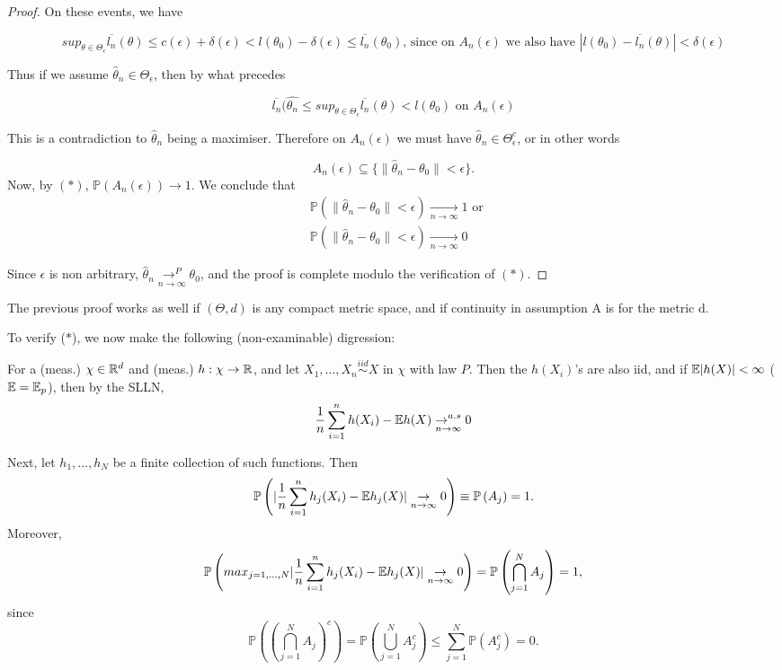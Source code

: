 \documentclass[a4paper]{article}
\begin{document}
\begin{proof}
	On these events, we have 

	\[
		sup_{\theta \in \Theta_{\epsilon}} \overline{l_n} (\theta) \le  c(\epsilon) + \delta(\epsilon) < l(\theta_0) - \delta(\epsilon) \le \overline{l_n}(\theta_{0}) \text{, since on $A_n(\epsilon)$ we also have } |l(\theta_0) - \overline{l_n}(\theta)| < \delta(\epsilon)
	\] 

	Thus if we assume $\hat{\theta}_n \in \Theta_{\epsilon}$, then by what precedes

	\[
		\overline{l_n}(\hat{\theta_n} \le  sup_{\theta \in \Theta_{\epsilon}} \overline{l_n}(\theta) < l(\theta_0) \text{ on } A_n(\epsilon)
	\]

	This is a contradiction to $\hat{\theta}_n$ being a maximiser. Therefore on $A_n(\epsilon)$ we must have  $\hat{\theta}_n \in  \Theta_{\epsilon}^{c}$, or in other words

	\[
		A_n(\epsilon) \subseteq \{\| \hat{\theta}_n - \theta_0\| < \epsilon\} 
	.\] 
	Now, by $(\ast)$,  $\mathbb{P}\left( A_n(\epsilon) \right) \to 1$. We conclude that
	 \begin{align*}
		&\mathbb{P}\left( \| \hat{\theta}_n - \theta_0 \| < \epsilon  \right) \underset{n\to \infty}{\to } 1 \text{ or } \\
		&\mathbb{P}\left( \| \hat{\theta}_n - \theta_0\| < \epsilon \right) \underset{n\to \infty}{\to } 0
	\end{align*}

	Since $\epsilon$ is non arbitrary,  $\hat{\theta}_n \underset{n\to \infty}{\to^{P} } \theta_0$, and the proof is complete modulo the verification of $(\ast)$.
\end{proof}

\begin{remark}
	The previous proof works as well if $(\Theta, d)$ is any compact metric space, and if continuity in assumption A is for the metric d.
\end{remark}

To verify ($\ast$), we now make the following (non-examinable) digression:

For a (meas.) $\chi \in \mathbb{R}^{d}$ and (meas.) $h: \chi \to \mathbb{R}$, and let $X_1, \ldots, X_n \stackrel{iid}{\sim} X$ in $\chi$ with law $P$. Then the $h(X_i)$'s are also iid, and if $\mathbb{E} |h(X)| < \infty$ ($\mathbb{E} = \mathbb{E}_p$), then by the SLLN,
\[
	\frac{1}{n} \sum_{i=1}^{n} h(X_i) - \mathbb{E} h(X) \underset{n \to \infty}{\to^{a.s}} 0 
\] 

Next, let $h_1, \ldots, h_N$ be a finite collection of such functions. Then
\[
	\mathbb{P}\left( |\frac{1}{n} \sum_{i=1}^{n} h_j (X_i) - \mathbb{E} h_j (X)  | \underset{n \to \infty}{\to} 0 \right) \equiv \mathbb{P}\left( A_j \right) = 1.
\] 
Moreover,
\[
	\mathbb{P}\left( max_{j=1,\ldots,N} |\frac{1}{n} \sum_{i=1}^{n} h_j (X_i) - \mathbb{E} h_j (X)  | \underset{n \to \infty}{\to} 0 \right) = \mathbb{P}\left( \bigcap_{j=1}^{N} A_j  \right) = 1,
\] since
\[
	\mathbb{P}\left( (\bigcap_{j=1}^{N}A_j)^{c}  \right) = \mathbb{P}\left( \bigcup_{j=1}^{N} A_j^{c}  \right) \le \sum_{j=1}^{N}\mathbb{P}\left( A_j^{c} \right) = 0.
\] 
\end{document}
